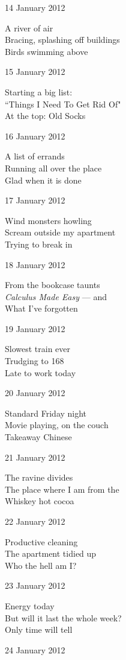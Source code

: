 \documentclass[12pt]{article}
\begin{document}
14 January 2012

A river of air \\
Bracing, splashing off buildings \\
Birds swimming above

15 January 2012

Starting a big list: \\
``Things I Need To Get Rid Of" \\
At the top: Old Socks

16 January 2012

A list of errands \\
Running all over the place \\
Glad when it is done

17 January 2012

Wind monsters howling \\
Scream outside my apartment \\
Trying to break in


\newpage

18 January 2012

From the bookcase taunts \\
{\em Calculus Made Easy} --- and \\
What I've forgotten

19 January 2012

Slowest train ever \\
Trudging to 168 \\
Late to work today

20 January 2012

Standard Friday night \\
Movie playing, on the couch \\
Takeaway Chinese

21 January 2012

The ravine divides \\
The place where I am from the \\
Whiskey hot cocoa

22 January 2012

Productive cleaning \\
The apartment tidied up \\
Who the hell am I?

23 January 2012

Energy today \\
But will it last the whole week? \\
Only time will tell

24 January 2012
\end{document}
